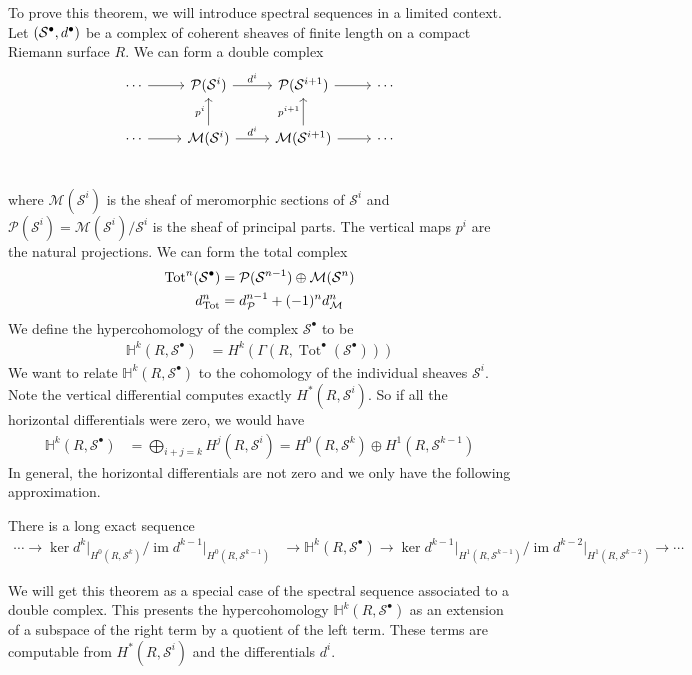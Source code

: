 \documentclass[12pt]{article}
\begin{document}
To prove this theorem, we will introduce spectral sequences in a limited context. Let $({\mathcal{S}}^{\bullet},d^{\bullet})$ be a complex of coherent sheaves of finite length on a compact Riemann surface $R$. We can form a double complex 
\[
\begin{tikzcd}[row sep=2em]
    \cdots \arrow[r] & \mathcal{P}(\mathcal{S}^i) \arrow[r, "d^i"] & \mathcal{P}(\mathcal{S}^{i+1}) \arrow[r] & \cdots \\
    \cdots \arrow[r] & \mathcal{M}(\mathcal{S}^i) \arrow[r, "d^i"] \arrow[u, "p^i"] & \mathcal{M}(\mathcal{S}^{i+1}) \arrow[r] \arrow[u, "p^{i+1}"] & \cdots \\
\end{tikzcd}
\] where $\mathcal{M}(\mathcal{S}^i)$ is the sheaf of meromorphic sections of $\mathcal{S}^i$ and $\mathcal{P}(\mathcal{S}^i) = \mathcal{M}(\mathcal{S}^i)/\mathcal{S}^i$ is the sheaf of principal parts. The vertical maps $p^i$ are the natural projections. We can form the total complex \begin{align*}
    \operatorname{Tot}^n(\mathcal{S}^{\bullet}) & = {\mathcal{P}}(\mathcal{S}^{n-1}) \oplus \mathcal{M}(\mathcal{S}^n) \\
    d_{\operatorname{Tot}}^n & = d_{{\mathcal{P}}}^{n-1} + (-1)^n d_{\mathcal{M}}^n
\end{align*} We define the hypercohomology of the complex $\mathcal{S}^{\bullet}$ to be \begin{align*}
    \mathbb{H}^k(R,\mathcal{S}^{\bullet}) & =  H^k(\Gamma(R,\operatorname{Tot}^{\bullet}(\mathcal{S}^{\bullet})))
\end{align*} We want to relate $\mathbb{H}^k(R,\mathcal{S}^{\bullet})$ to the cohomology of the individual sheaves $\mathcal{S}^i$. Note the vertical differential computes exactly $H^*(R,\mathcal{S}^i)$. So if all the horizontal differentials were zero, we would have \begin{align*}
    \mathbb{H}^k(R,\mathcal{S}^{\bullet}) & = \bigoplus_{i+j=k} H^j(R,\mathcal{S}^i) = H^0(R,\mathcal{S}^k) \oplus H^1(R,\mathcal{S}^{k-1})
\end{align*} In general, the horizontal differentials are not zero and we only have the following approximation.
\begin{theorem}
    There is a long exact sequence \begin{align*}
        \cdots \to \ker{d^k\vert_{H^0(R,\mathcal{S}^k)}} \bigg / \operatorname{im}{d^{k-1}\vert_{H^0(R,\mathcal{S}^{k-1})}} & \to \mathbb{H}^k(R,\mathcal{S}^{\bullet}) \to \ker{d^{k-1}\vert_{H^1(R,\mathcal{S}^{k-1})}} \bigg/ \operatorname{im}{d^{k-2}\vert_{H^1(R,\mathcal{S}^{k-2})}} \to \cdots
    \end{align*}
\end{theorem}
We will get this theorem as a special case of the spectral sequence associated to a double complex. This presents the hypercohomology $\mathbb{H}^k(R,\mathcal{S}^{\bullet})$ as an extension of a subspace of the right term by a quotient of the left term. These terms are computable from $H^*(R,\mathcal{S}^i)$ and the differentials $d^i$.
\end{document}
